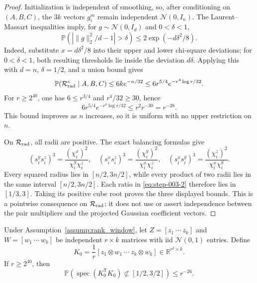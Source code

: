\begin{proof}
Initialization is independent of smoothing, so,
after conditioning on \((A,B,C)\), the \(3k\) vectors \(g_i^m\) remain
independent \(\mathcal N(0,I_n)\).  The Laurent--Massart inequalities
\citep[Lemma~1]{laurentMassart2000} imply, for
\(g\sim\mathcal N(0,I_d)\) and \(0<\delta<1\),
\[
  \mathbb P\!\left(\left|\|g\|_2^2/d-1\right|>\delta\right)
  \le 2\exp(-d\delta^2/8).
\]
Indeed, substitute \(x=d\delta^2/8\) into their upper and lower
chi-square deviations; for \(0<\delta<1\), both resulting thresholds lie
inside the deviation \(d\delta\).  Applying this with \(d=n\),
\(\delta=1/2\), and a union bound gives
\[
  \mathbb P(\mathcal R_{\rm rad}^c\mid A,B,C)
  \le 6k e^{-n/32}
  \le 6r^{5/4}e^{-r^4\log r/32}.
\]
For \(r\ge2^{40}\), one has \(6\le r^{3/4}\) and \(r^4/32\ge30\), hence
\begin{equation}
  6r^{5/4}e^{-r^4\log r/32}
  \le r^2r^{-30}=r^{-28}.                                  \label{eq:step-003-1}
\end{equation}
This bound improves as \(n\) increases, so it is uniform with no upper
restriction on \(n\).

On \(\mathcal R_{\rm rad}\), all radii are positive. The exact balancing formulas give
\begin{equation}
  (s_i^ys_i^z)^3
    =\frac{(\chi_i^x)^2}{\chi_i^y\chi_i^z},\quad
  (s_i^xs_i^z)^3
    =\frac{(\chi_i^y)^2}{\chi_i^x\chi_i^z},\quad
  (s_i^xs_i^y)^3
    =\frac{(\chi_i^z)^2}{\chi_i^x\chi_i^y}.                \label{eq:step-003-2}
\end{equation}
Every squared radius lies in \([n/2,3n/2]\), while every product of two
radii lies in the same interval \([n/2,3n/2]\). Each ratio in \eqref{eq:step-003-2} therefore
lies in \([1/3,3]\). Taking its positive cube root proves the three displayed
bounds. This is a pointwise consequence on \(\mathcal R_{\rm rad}\); it does
not use or assert independence between the pair multipliers and the projected
Gaussian coefficient vectors. 

\end{proof}


\begin{lemma}
\label{lem:step-003-isotropic-khatri-rao}
Under Assumption~\ref{assump:rank_window}, let
\(Z=[z_1\ \cdots\ z_k]\) and \(W=[w_1\ \cdots\ w_k]\) be independent
\(r\times k\) matrices with iid \(\mathcal N(0,1)\) entries. Define
\[
  K_0=\frac1r
    [z_1\otimes w_1\ \cdots\ z_k\otimes w_k]
    \in\mathbb R^{r^2\times k}.
\]
If \(r\ge2^{40}\), then
\begin{equation}
  \mathbb P\!\left(
    \operatorname{spec}(K_0^{\mathsf T}K_0)
      \not\subset[1/2,3/2]
  \right)\le r^{-26}.                                      \label{eq:step-003-3}
\end{equation}

\end{lemma}

